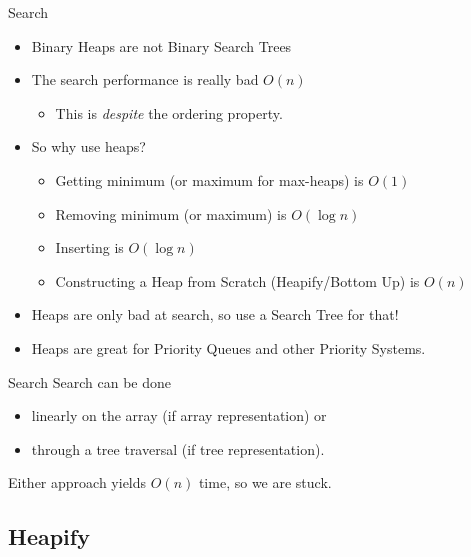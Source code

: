\documentclass[10pt,compress]{beamer}
\begin{document}
\begin{frame}{Search}
  \begin{itemize}
    \item Binary Heaps are not Binary Search Trees
    \item The search performance is really bad $O(n)$
          \begin{itemize}
            \item This is \emph{despite} the ordering property.
          \end{itemize}
    \item So why use heaps?
          \begin{itemize}
            \item Getting minimum (or maximum for max-heaps) is $O(1)$
            \item Removing minimum (or maximum) is $O(\log n)$
            \item Inserting is $O(\log n)$
            \item Constructing a Heap from Scratch (Heapify/Bottom Up) is $O(n)$
          \end{itemize}
    \item Heaps are only bad at search, so use a Search Tree for that!
    \item Heaps are great for Priority Queues and other Priority Systems.
  \end{itemize}
\end{frame}

\begin{frame}{Search}
  Search can be done
  \begin{itemize}
    \item linearly on the array (if array representation) or
    \item through a tree traversal (if tree representation).
  \end{itemize}
  Either approach yields $O(n)$ time, so we are stuck.
\end{frame}

\subsection{Heapify}
\end{document}
